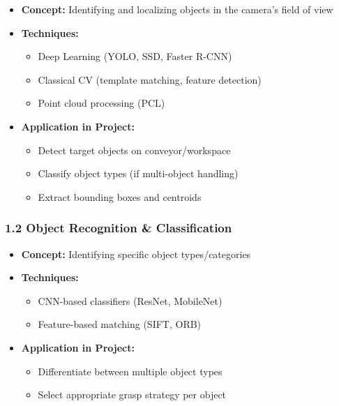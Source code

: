 \documentclass[
]{article}
\providecommand{\tightlist}{%
  \setlength{\itemsep}{0pt}\setlength{\parskip}{0pt}}
\begin{document}
\begin{itemize}
\tightlist
\item
  \textbf{Concept:} Identifying and localizing objects in the camera's
  field of view
\item
  \textbf{Techniques:}

  \begin{itemize}
  \tightlist
  \item
    Deep Learning (YOLO, SSD, Faster R-CNN)
  \item
    Classical CV (template matching, feature detection)
  \item
    Point cloud processing (PCL)
  \end{itemize}
\item
  \textbf{Application in Project:}

  \begin{itemize}
  \tightlist
  \item
    Detect target objects on conveyor/workspace
  \item
    Classify object types (if multi-object handling)
  \item
    Extract bounding boxes and centroids
  \end{itemize}
\end{itemize}

\hypertarget{object-recognition-classification}{%
\subsubsection{1.2 Object Recognition \&
Classification}\label{object-recognition-classification}}

\begin{itemize}
\tightlist
\item
  \textbf{Concept:} Identifying specific object types/categories
\item
  \textbf{Techniques:}

  \begin{itemize}
  \tightlist
  \item
    CNN-based classifiers (ResNet, MobileNet)
  \item
    Feature-based matching (SIFT, ORB)
  \end{itemize}
\item
  \textbf{Application in Project:}

  \begin{itemize}
  \tightlist
  \item
    Differentiate between multiple object types
  \item
    Select appropriate grasp strategy per object
  \end{itemize}
\end{itemize}
\end{document}

